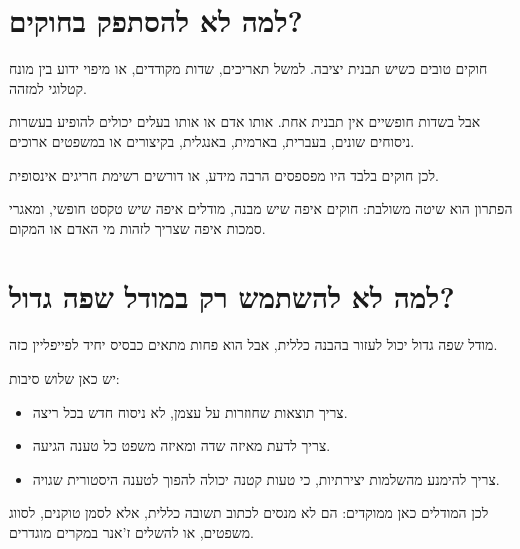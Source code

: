 \documentclass[12pt,a4paper]{article}
\begin{document}
\section{\texthebrew{למה לא להסתפק בחוקים?}}
\begin{hebrew}
חוקים טובים כשיש תבנית יציבה. למשל תאריכים, שדות מקודדים, או מיפוי ידוע בין מונח קטלוגי למזהה.
\par
אבל בשדות חופשיים אין תבנית אחת. אותו אדם או אותו בעלים יכולים להופיע בעשרות ניסוחים שונים, בעברית, בארמית, באנגלית, בקיצורים או במשפטים ארוכים.
\par
לכן חוקים בלבד היו מפספסים הרבה מידע, או דורשים רשימת חריגים אינסופית.
\par
הפתרון הוא שיטה משולבת: חוקים איפה שיש מבנה, מודלים איפה שיש טקסט חופשי, ומאגרי סמכות איפה שצריך לזהות מי האדם או המקום.
\end{hebrew}

\section{\texthebrew{למה לא להשתמש רק במודל שפה גדול?}}
\begin{hebrew}
מודל שפה גדול יכול לעזור בהבנה כללית, אבל הוא פחות מתאים כבסיס יחיד לפייפליין כזה.
\par
יש כאן שלוש סיבות:
\begin{itemize}
  \item צריך תוצאות שחוזרות על עצמן, לא ניסוח חדש בכל ריצה.
  \item צריך לדעת מאיזה שדה ומאיזה משפט כל טענה הגיעה.
  \item צריך להימנע מהשלמות יצירתיות, כי טעות קטנה יכולה להפוך לטענה היסטורית שגויה.
\end{itemize}
\par
לכן המודלים כאן ממוקדים: הם לא מנסים לכתוב תשובה כללית, אלא לסמן טוקנים, לסווג משפטים, או להשלים ז'אנר במקרים מוגדרים.
\end{hebrew}
\end{document}
